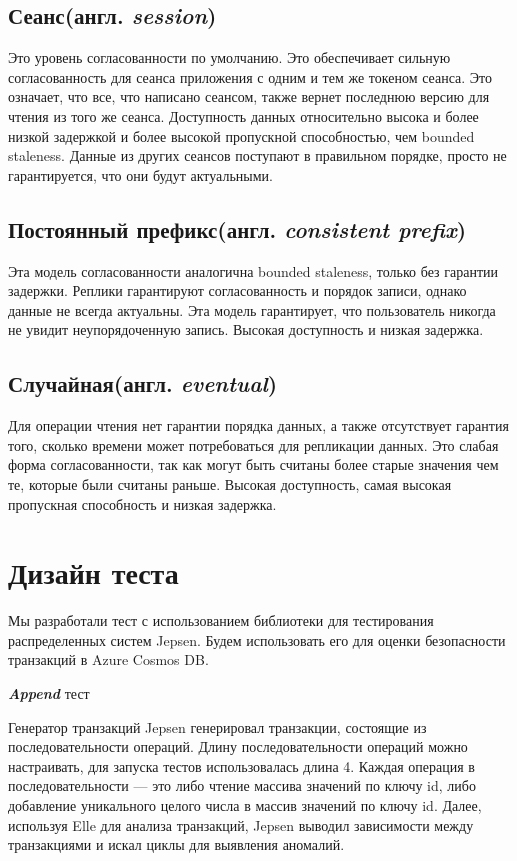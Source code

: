 \documentclass[12pt,  openany]{book}
\begin{document}
\subsection{Сеанс(англ.  \textit{session})}
Это уровень согласованности по умолчанию. Это обеспечивает сильную согласованность для сеанса приложения с одним и тем же токеном сеанса. Это означает, что все, что написано сеансом, также вернет последнюю версию для чтения из того же сеанса. Доступность данных относительно высока и более низкой задержкой и более высокой пропускной способностью, чем bounded staleness. Данные из других сеансов поступают в правильном порядке, просто не гарантируется, что они будут актуальными.
\subsection{Постоянный префикс(англ.  \textit{consistent prefix})}
Эта модель согласованности аналогична bounded staleness, только без гарантии задержки. Реплики гарантируют согласованность и порядок записи, однако данные не всегда актуальны. Эта модель гарантирует, что пользователь никогда не увидит неупорядоченную запись. Высокая доступность и низкая задержка.
\subsection{Случайная(англ.  \textit{eventual})}
Для операции чтения нет гарантии порядка данных, а также отсутствует гарантия того, сколько времени может потребоваться для репликации данных.  Это слабая форма согласованности, так как могут быть считаны более старые значения чем те, которые были считаны раньше.
Высокая доступность, самая высокая пропускная способность и низкая задержка.

\section{Дизайн теста}
Мы разработали тест с использованием библиотеки для тестирования распределенных систем Jepsen. Будем использовать его для оценки безопасности транзакций в Azure Cosmos DB. 
\par
\textit{\textbf{Append}} тест
\par
Генератор транзакций Jepsen генерировал транзакции, состоящие из последовательности операций. Длину последовательности операций можно настраивать, для запуска тестов использовалась длина 4. Каждая операция в последовательности --- это либо чтение массива значений по ключу id, либо добавление уникального целого числа в массив значений по ключу id. 
Далее, используя Elle для анализа транзакций, Jepsen выводил зависимости между транзакциями и искал циклы для выявления аномалий. 
\end{document}
